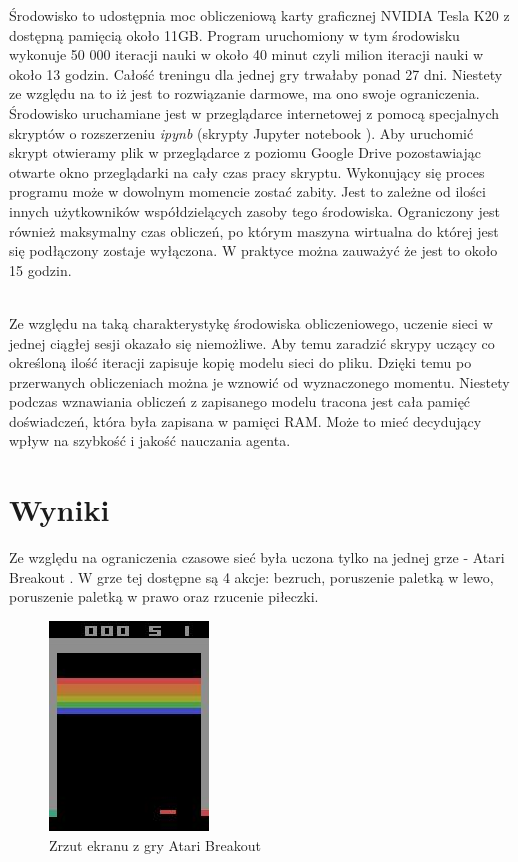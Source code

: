 \documentclass[12pt]{article}
\begin{document}
Środowisko to udostępnia moc obliczeniową karty graficznej NVIDIA Tesla K20 z dostępną pamięcią około 11GB. Program uruchomiony w tym środowisku wykonuje 50 000 iteracji nauki w około 40 minut czyli milion iteracji nauki w około 13 godzin. Całość treningu dla jednej gry trwałaby ponad 27 dni. Niestety ze względu na to iż jest to rozwiązanie darmowe, ma ono swoje ograniczenia. Środowisko uruchamiane jest w przeglądarce internetowej z pomocą specjalnych skryptów o rozszerzeniu \textit{ipynb} (skrypty Jupyter notebook \cite{jupiter}). Aby uruchomić skrypt otwieramy plik w przeglądarce z poziomu Google Drive \cite{drive} pozostawiając otwarte okno przeglądarki na cały czas pracy skryptu. Wykonujący się proces programu może w dowolnym momencie zostać zabity. Jest to zależne od ilości innych użytkowników współdzielących zasoby tego środowiska. Ograniczony jest również maksymalny czas obliczeń, po którym maszyna wirtualna do której jest się podłączony zostaje wyłączona. W praktyce można zauważyć że jest to około 15 godzin. 
\\\

Ze względu na taką charakterystykę środowiska obliczeniowego, uczenie sieci w jednej ciągłej sesji okazało się niemożliwe. Aby temu zaradzić skrypy uczący co określoną ilość iteracji zapisuje kopię modelu sieci do pliku. Dzięki temu po przerwanych obliczeniach można je wznowić od wyznaczonego momentu. Niestety podczas wznawiania obliczeń z zapisanego modelu tracona jest cała pamięć doświadczeń, która była zapisana w pamięci RAM. Może to mieć decydujący wpływ na szybkość i jakość nauczania agenta.


\section{Wyniki}
Ze względu na ograniczenia czasowe sieć była uczona tylko na jednej grze - Atari Breakout \cite{breakout}. W grze tej dostępne są 4 akcje: bezruch, poruszenie paletką w lewo, poruszenie paletką w prawo oraz rzucenie piłeczki.


\begin{figure}[H]
\centering \includegraphics[scale=1]{1_raw.jpg}
\caption{Zrzut ekranu z gry Atari Breakout}
\label{atari1}
\end{figure}
\end{document}
